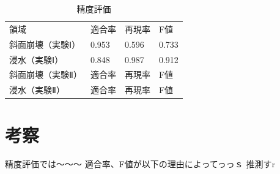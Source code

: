 \documentclass[../Thesis]{subfiles}
\begin{document}

\begin{table}[h]
	\centering
	\caption{精度評価}
	\label{tab04}
	\begin{tabular}{l l l l}
		\hline
		領域 & 適合率 & 再現率 & F値 \\
		斜面崩壊（実験Ⅰ） & 0.953 & 0.596 & 0.733 \\
		浸水（実験Ⅰ） & 0.848 & 0.987 & 0.912 \\
		斜面崩壊（実験Ⅱ） & 適合率 & 再現率 & F値 \\
		浸水（実験Ⅱ） & 適合率 & 再現率 & F値 \\
		\hline
	\end{tabular}
\end{table}


\section{考察}
	精度評価では～～～
	適合率、F値が以下の理由によってっっｓ
	推測すr
\end{document}
